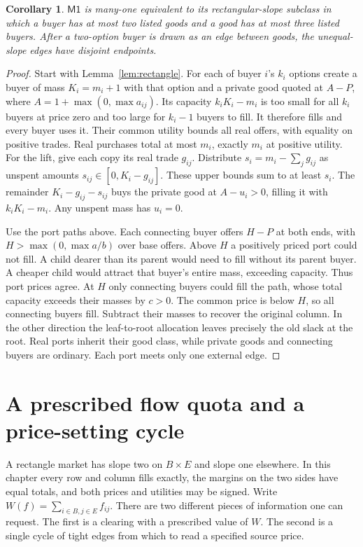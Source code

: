 \documentclass[11pt,oneside,openany,notitlepage]{report}
\newtheorem{corollary}[theorem]{Corollary}
\newcommand{\Market}{\mathsf{M1}}
\begin{document}
\begin{corollary}\label{cor:sparsemarket}
\(\Market\) is many-one equivalent to its rectangular-slope subclass in
which a buyer has at most two listed goods and a good has at most three
listed buyers. After a two-option buyer is drawn as an edge between
goods, the unequal-slope edges have disjoint endpoints.
\end{corollary}
\begin{proof}
Start with Lemma~\ref{lem:rectangle}. For each of buyer \(i\)'s \(k_i\)
options create a buyer of mass \(K_i=m_i+1\) with that option and a
private good quoted at \(A-P\), where \(A=1+\max(0,\max a_{ij})\).
Its capacity \(k_iK_i-m_i\) is too small for all \(k_i\) buyers at
price zero and too large for \(k_i-1\) buyers to fill. It therefore
fills and every buyer uses it. Their common utility bounds all real
offers, with equality on positive trades. Real purchases total at most
\(m_i\), exactly \(m_i\) at positive utility. For the lift, give each copy its real trade \(g_{ij}\). Distribute
\(s_i=m_i-\sum_jg_{ij}\) as unspent amounts \(s_{ij}\in[0,K_i-g_{ij}]\). These upper bounds sum to at least \(s_i\). The remainder
\(K_i-g_{ij}-s_{ij}\) buys the private good at \(A-u_i>0\), filling it
with \(k_iK_i-m_i\). Any unspent mass has \(u_i=0\).

Use the port paths above. Each connecting buyer offers \(H-P\) at both
ends, with \(H>\max(0,\max a/b)\) over base offers. Above \(H\) a
positively priced port could not fill. A child dearer than its parent
would need to fill without its parent buyer. A cheaper child would
attract that buyer's entire mass, exceeding capacity. Thus port prices
agree. At \(H\) only connecting buyers could fill the path, whose
total capacity exceeds their masses by \(c>0\). The common price is
below \(H\), so all connecting buyers fill. Subtract their masses to
recover the original column. In the other direction the leaf-to-root
allocation leaves precisely the old slack at the root. Real ports
inherit their good class, while private goods and connecting buyers
are ordinary. Each port meets only one external edge.
\end{proof}

\chapter{A prescribed flow quota and a price-setting cycle}\label{sec:quota}

A rectangle market has slope two on \(B\times E\) and slope one
elsewhere. In this chapter every row and column fills exactly, the
margins on the two sides have equal totals, and both prices and
utilities may be signed. Write \(W(f)=\sum_{i\in B,j\in E}f_{ij}\).
There are two different pieces of information one can request. The
first is a clearing with a prescribed value of \(W\). The second is a
single cycle of tight edges from which to read a specified source price.
\end{document}
